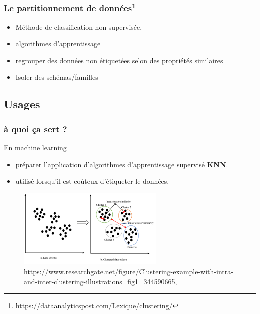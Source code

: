 \begin{frame}
  \frametitle{Le partitionnement de données\footnote{\url{https://dataanalyticspost.com/Lexique/clustering/}}}


 \begin{itemize}
  \item {} Méthode de classification non supervisée, 
  \item {} algorithmes d’apprentissage 
  \item {} regrouper des données non étiquetées selon des propriétés similaires
  \item {} Isoler des schémas/familles
  
  
 \end{itemize}
 


\end{frame}


\subsection{Usages}
\begin{frame}
  \frametitle{ à quoi ça sert ?}
  En machine learning
  \begin{itemize}
  \item {} préparer l’application d’algorithmes d’apprentissage supervisé  \textbf{KNN}.\\
\item {} utilisé lorsqu’il est coûteux d’étiqueter le données.
\end{itemize}

 \begin{figure}
  \includegraphics[width=7cm]{images/Clustering-example-with-intra-and-inter-clustering-illustrations.png}
  \caption{\url{https://www.researchgate.net/figure/Clustering-example-with-intra-and-inter-clustering-illustrations_fig1_344590665}, \cite{10.1007/s00521-020-05395-4}}
  \end{figure}
  
\end{frame}

